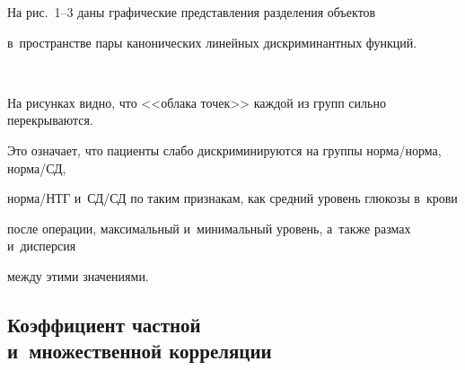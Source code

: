     

    



На рис.~1--3 даны графические представления разделения объектов 

в~пространстве пары канонических линейных дискриминантных функций.



\pagebreak



\



\vspace*{-12pt}












На рисунках видно, что <<облака точек>> каждой из групп сильно перекрываются. 

Это означает, что пациенты слабо дискриминируются на группы нор\-ма/нор\-ма, нор\-ма/СД, 

нор\-ма/НТГ и~СД/СД по таким признакам, как средний уровень глюкозы в~крови 

после операции, максимальный и~минимальный уровень, а~также размах и~дисперсия 

между этими значениями.



\subsection{Коэффициент частной\\ \hspace*{21pt}и~множественной корреляции}



